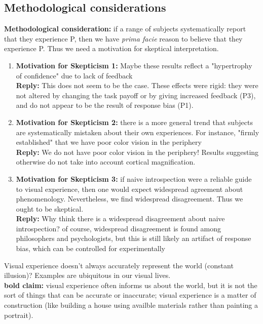 \documentclass{article}
\begin{document}
\subsection{Methodological considerations}
\textbf{Methodological consideration:} if a range of subjects systematically report that they experience P, then we have \textit{prima facie} reason to believe that they experience P. Thus we need a motivation for skeptical interpretation. 
\begin{enumerate}
    \item \textbf{Motivation for Skepticism 1:} Maybe these results reflect a "hypertrophy of confidence" due to lack of feedback \\
    \textbf{Reply:} This does not seem to be the case. These effects were rigid: they were not altered by changing the task payoff or by giving increased feedback (P3), and do not appear to be the result of response bias (P1). 
    \item \textbf{Motivation for Skepticism 2:} there is a more general trend that subjects are systematically mistaken about their own experiences. For instance, "firmly established" that we have poor color vision in the periphery \\ 
    \textbf{Reply:} We do not have poor color vision in the periphery! Results suggesting otherwise do not take into account cortical magnification. 
    \item \textbf{Motivation for Skepticism 3:} if naive introspection were a reliable guide to visual experience, then one would expect widespread agreement about phenomenology. Nevertheless, we find widespread disagreement. Thus we ought to be skeptical. \\
    \textbf{Reply:} Why think there is a widespread disagreement about naive introspection? of course, widespread disagreement is found among philosophers and psychologists, but this is still likely an artifact of response bias, which can be controlled for experimentally
\end{enumerate}

\noindent Visual experience doesn't always accurately represent the world (constant illusion)? Examples are ubiquitous in our visual lives. \\ 

\textbf{bold claim:} visual experience often informs us about the world, but it is not the sort of things that can be accurate or inaccurate; visual experience is a matter of construction (like building a house using availble materials rather than painting a portrait).  
\end{document}
